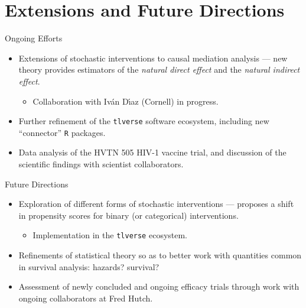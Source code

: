\documentclass{beamer}
\begin{document}

\section{Extensions and Future Directions}


\begin{frame}[c]{Ongoing Efforts}

\begin{center}
\begin{itemize}
  \itemsep10pt
  \item Extensions of stochastic interventions to causal mediation analysis ---
    new theory provides estimators of the \textit{natural direct effect} and the
    \textit{natural indirect effect}.
    \begin{itemize}
      \item Collaboration with Iv{\'a}n D{\'\i}az (Cornell) in progress.
    \end{itemize}
  \item Further refinement of the \texttt{tlverse} software ecosystem, including
    new ``connector'' \texttt{R} packages.
  \item Data analysis of the HVTN 505 HIV-1 vaccine trial, and discussion of the
    scientific findings with scientist collaborators.
\end{itemize}
\end{center}

\note{
}

\end{frame}


\begin{frame}[c]{Future Directions}

\begin{center}
\begin{itemize}
  \itemsep10pt
  \item Exploration of different forms of stochastic interventions ---
    \cite{kennedy2018nonparametric} proposes a shift in propensity scores for
    binary (or categorical) interventions.
    \begin{itemize}
      \item Implementation in the \texttt{tlverse} ecosystem.
    \end{itemize}
  \item Refinements of statistical theory so as to better work with quantities
    common in survival analysis: hazards? survival?
  \item Assessment of newly concluded and ongoing efficacy trials through work
    with ongoing collaborators at Fred Hutch.
\end{itemize}
\end{center}

\note{
}

\end{frame}
\end{document}
